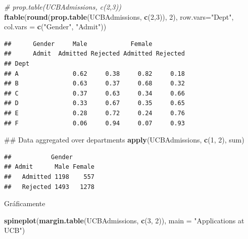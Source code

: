\documentclass[]{book}
\newenvironment{Shaded}{\begin{snugshade}}{\end{snugshade}}
\newcommand{\KeywordTok}[1]{\textcolor[rgb]{0.13,0.29,0.53}{\textbf{#1}}}
\newcommand{\DataTypeTok}[1]{\textcolor[rgb]{0.13,0.29,0.53}{#1}}
\newcommand{\DecValTok}[1]{\textcolor[rgb]{0.00,0.00,0.81}{#1}}
\newcommand{\StringTok}[1]{\textcolor[rgb]{0.31,0.60,0.02}{#1}}
\newcommand{\CommentTok}[1]{\textcolor[rgb]{0.56,0.35,0.01}{\textit{#1}}}
\newcommand{\NormalTok}[1]{#1}
\begin{document}
\begin{Shaded}
\begin{Highlighting}[]
\CommentTok{# prop.table(UCBAdmissions, c(2,3))}
\KeywordTok{ftable}\NormalTok{(}\KeywordTok{round}\NormalTok{(}\KeywordTok{prop.table}\NormalTok{(UCBAdmissions, }\KeywordTok{c}\NormalTok{(}\DecValTok{2}\NormalTok{,}\DecValTok{3}\NormalTok{)), }\DecValTok{2}\NormalTok{),}
       \DataTypeTok{row.vars=}\StringTok{"Dept"}\NormalTok{, }\DataTypeTok{col.vars =} \KeywordTok{c}\NormalTok{(}\StringTok{"Gender"}\NormalTok{, }\StringTok{"Admit"}\NormalTok{))}
\end{Highlighting}
\end{Shaded}

\begin{verbatim}
##      Gender     Male            Female         
##      Admit  Admitted Rejected Admitted Rejected
## Dept                                           
## A               0.62     0.38     0.82     0.18
## B               0.63     0.37     0.68     0.32
## C               0.37     0.63     0.34     0.66
## D               0.33     0.67     0.35     0.65
## E               0.28     0.72     0.24     0.76
## F               0.06     0.94     0.07     0.93
\end{verbatim}

\begin{Shaded}
\begin{Highlighting}[]
\NormalTok{## Data aggregated over departments}
\KeywordTok{apply}\NormalTok{(UCBAdmissions, }\KeywordTok{c}\NormalTok{(}\DecValTok{1}\NormalTok{, }\DecValTok{2}\NormalTok{), sum)}
\end{Highlighting}
\end{Shaded}

\begin{verbatim}
##           Gender
## Admit      Male Female
##   Admitted 1198    557
##   Rejected 1493   1278
\end{verbatim}

Gráficamente

\begin{Shaded}
\begin{Highlighting}[]
\KeywordTok{spineplot}\NormalTok{(}\KeywordTok{margin.table}\NormalTok{(UCBAdmissions, }\KeywordTok{c}\NormalTok{(}\DecValTok{3}\NormalTok{, }\DecValTok{2}\NormalTok{)),}
           \DataTypeTok{main =} \StringTok{"Applications at UCB"}\NormalTok{)}
\end{Highlighting}
\end{Shaded}
\end{document}
